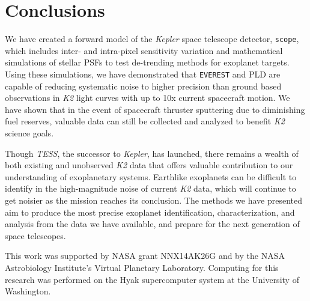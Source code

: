 \documentclass[12pt,preprint]{aastex}
\begin{document}
\section{Conclusions}

We have created a forward model of the \textit{Kepler} space telescope detector, \texttt{scope}, which includes inter- and intra-pixel sensitivity variation and mathematical simulations of stellar PSFs to test de-trending methods for exoplanet targets. Using these simulations, we have demonstrated that \texttt{EVEREST} and PLD are  capable of reducing systematic noise to higher precision than ground based observations in \textit{K2} light curves with up to 10x current spacecraft motion. We have shown that in the event of spacecraft thruster sputtering due to diminishing fuel reserves, valuable data can still be collected and analyzed to benefit \textit{K2} science goals.

Though \textit{TESS}, the successor to \textit{Kepler}, has launched, there remains a wealth of both existing and unobserved \textit{K2} data that offers valuable contribution to our understanding of exoplanetary systems. Earthlike exoplanets can be difficult to identify in the high-magnitude noise of current \textit{K2} data, which will continue to get noisier as the mission reaches its conclusion. The methods we have presented aim to produce the most precise exoplanet identification, characterization, and analysis from the data we have available, and prepare for the next generation of space telescopes.

This work was supported by NASA grant NNX14AK26G and by the NASA Astrobiology Institute's Virtual Planetary Laboratory. Computing for this research was performed on the Hyak supercomputer system at the University of Washington.

\clearpage


\end{document}
